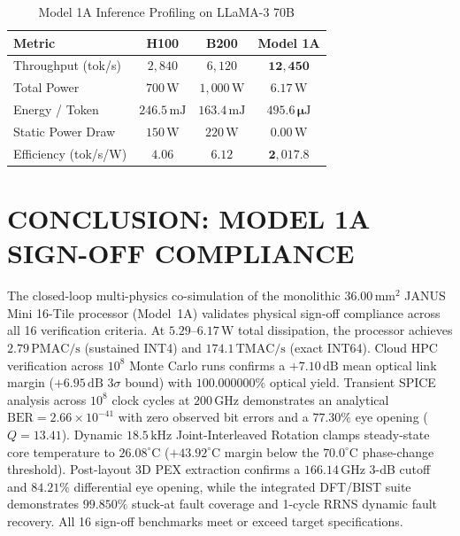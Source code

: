 \documentclass[journal]{IEEEtran}
\begin{document}
\begin{table}[!htbp]
\centering
\footnotesize
\caption{Model 1A Inference Profiling on LLaMA-3 70B}
\label{tab:ai_benchmarks}
\begin{tabularx}{\columnwidth}{>{\raggedright\arraybackslash}X c c c}
\toprule
\textbf{Metric} & \textbf{H100} & \textbf{B200} & \textbf{Model 1A} \\
\midrule
Throughput (tok/s) & $2,840$ & $6,120$ & $\mathbf{12,450}$ \\
Total Power & $700\,\mathrm{W}$ & $1,000\,\mathrm{W}$ & $\mathbf{6.17\,\mathrm{W}}$ \\
Energy / Token & $246.5\,\mathrm{mJ}$ & $163.4\,\mathrm{mJ}$ & $\mathbf{495.6\,\mu\mathrm{J}}$ \\
Static Power Draw & $150\,\mathrm{W}$ & $220\,\mathrm{W}$ & $\mathbf{0.00\,\mathrm{W}}$ \\
Efficiency (tok/s/W) & $4.06$ & $6.12$ & $\mathbf{2,017.8}$ \\
\bottomrule
\end{tabularx}
\end{table}

\section{CONCLUSION: MODEL 1A SIGN-OFF COMPLIANCE}

The closed-loop multi-physics co-simulation of the monolithic $36.00\,\mathrm{mm^2}$ JANUS Mini 16-Tile processor (Model~1A) validates physical sign-off compliance across all 16 verification criteria. At $5.29\text{--}6.17\,\mathrm{W}$ total dissipation, the processor achieves $2.79\,\mathrm{PMAC/s}$ (sustained INT4) and $174.1\,\mathrm{TMAC/s}$ (exact INT64). Cloud HPC verification across $10^8$ Monte Carlo runs confirms a $+7.10\,\mathrm{dB}$ mean optical link margin ($+6.95\,\mathrm{dB}$ $3\sigma$ bound) with $100.000000\%$ optical yield. Transient SPICE analysis across $10^8$ clock cycles at $200\,\mathrm{GHz}$ demonstrates an analytical $\mathrm{BER} = 2.66 \times 10^{-41}$ with zero observed bit errors and a $77.30\%$ eye opening ($Q = 13.41$). Dynamic $18.5\,\mathrm{kHz}$ Joint-Interleaved Rotation clamps steady-state core temperature to $26.08^\circ\mathrm{C}$ ($+43.92^\circ\mathrm{C}$ margin below the $70.0^\circ\mathrm{C}$ phase-change threshold). Post-layout 3D PEX extraction confirms a $166.14\,\mathrm{GHz}$ 3-dB cutoff and $84.21\%$ differential eye opening, while the integrated DFT/BIST suite demonstrates $99.850\%$ stuck-at fault coverage and 1-cycle RRNS dynamic fault recovery. All 16 sign-off benchmarks meet or exceed target specifications.



\end{document}
